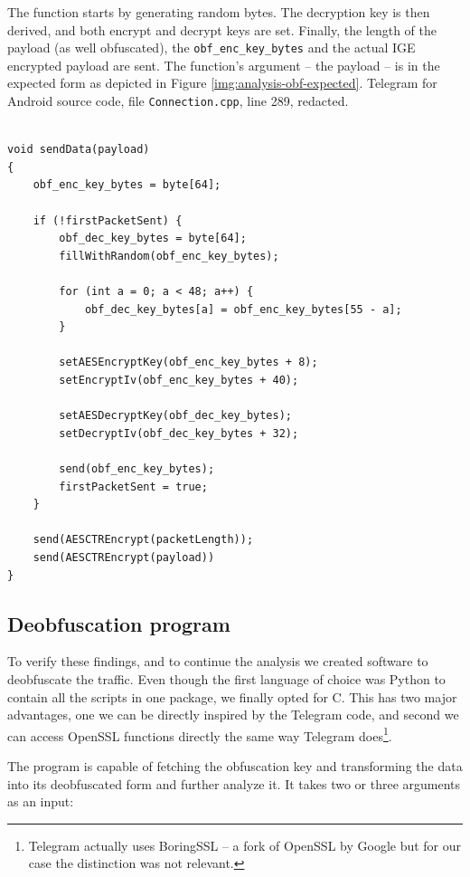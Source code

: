 \documentclass[thesis=M,english]{FITthesis}[2012/10/20]
\newcommand{\cpp}{C\nolinebreak\hspace{-.05em}\raisebox{.4ex}{\tiny +}\nolinebreak\hspace{-.10em}\raisebox{.4ex}{\tiny +}}
\begin{document}
\begin{listing}[htb]
\caption{The function starts by generating random bytes. The decryption key is then derived, and both encrypt and decrypt keys are set. Finally, the length of the payload (as well obfuscated), the \texttt{obf\_enc\_key\_bytes} and the actual IGE encrypted payload are sent. The function's argument -- the payload -- is in the expected form as depicted in Figure \ref{img:analysis-obf-expected}.
\protect\linebreak Telegram for Android source code, file \texttt{Connection.cpp}, line 289, redacted.}
\label{lst:analysis-obfuscation}
\begin{verbatim}

void sendData(payload)
{
    obf_enc_key_bytes = byte[64];

    if (!firstPacketSent) {
        obf_dec_key_bytes = byte[64];
        fillWithRandom(obf_enc_key_bytes);

        for (int a = 0; a < 48; a++) {
            obf_dec_key_bytes[a] = obf_enc_key_bytes[55 - a];
        }

        setAESEncryptKey(obf_enc_key_bytes + 8);
        setEncryptIv(obf_enc_key_bytes + 40);

        setAESDecryptKey(obf_dec_key_bytes);
        setDecryptIv(obf_dec_key_bytes + 32);
        
        send(obf_enc_key_bytes);
        firstPacketSent = true;
    }

    send(AESCTREncrypt(packetLength));
    send(AESCTREncrypt(payload))
}
\end{verbatim}
\end{listing}

\subsection{Deobfuscation program}\label{analysis-obf-program}

To verify these findings, and to continue the analysis we created software to deobfuscate the traffic. Even though the first language of choice was Python to contain all the scripts in one package, we finally opted for \cpp. This has two major advantages, one we can be directly inspired by the Telegram code, and second we can access OpenSSL functions directly the same way Telegram does\footnote{Telegram actually uses BoringSSL -- a fork of OpenSSL by Google but for our case the distinction was not relevant.}.

The program is capable of fetching the obfuscation key and transforming the data into its deobfuscated form and further analyze it. It takes two or three arguments as an input:
\end{document}
